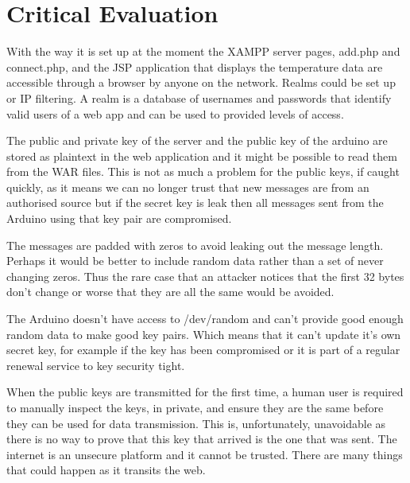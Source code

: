 \chapter{Critical Evaluation}
\label{crit}



With the way it is set up at the moment the XAMPP server pages, add.php and connect.php, and the JSP application that displays the temperature data are accessible through a browser by anyone on the network. Realms could be set up or IP filtering. A realm is a database of usernames and passwords that identify valid users of a web app and can be used to provided levels of access.


The public and private key of the server and the public key of the arduino are stored as plaintext in the web application and it might be possible to read them from the WAR files. This is not as much a problem for the public keys, if caught quickly, as it means we can no longer trust that new messages are from an authorised source but if the secret key is leak then all messages sent from the Arduino using that key pair are compromised. 

The messages are padded with zeros to avoid leaking out the message length. Perhaps it would be better to include random data rather than a set of never changing zeros. Thus the rare case that an attacker notices that the first 32 bytes don't change or worse that they are all the same would be avoided.

The Arduino doesn't have access to /dev/random and can't provide good enough random data to make good key pairs. Which means that it can't update it's own secret key, for example if the key has been compromised or it is part of a regular renewal service to key security tight.

When the public keys are transmitted for the first time, a human user is required to manually inspect the keys, in private, and ensure they are the same before they can be used for data transmission. This is, unfortunately, unavoidable as there is no way to prove that this key that arrived is the one that was sent. The internet is an unsecure platform and it cannot be trusted. There are many things that could happen as it transits the web. 

